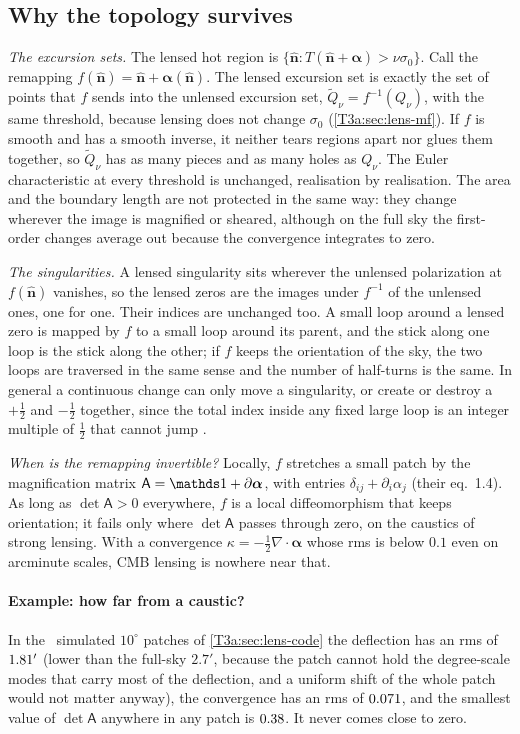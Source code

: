 \subsection{Why the topology survives}
\label{T3a:sec:protect}

\emph{The excursion sets.} The lensed hot region is $\{\hat{\bm n}:T(\hat{\bm n}+\bm\alpha)>\nu\sigma_0\}$. Call the remapping $f(\hat{\bm n})=\hat{\bm n}+\bm\alpha(\hat{\bm n})$. The lensed excursion set is exactly the set of points that $f$ sends into the unlensed excursion set, $\tilde Q_\nu=f^{-1}(Q_\nu)$, with the same threshold, because lensing does not change $\sigma_0$ (\cref{T3a:sec:lens-mf}). If $f$ is smooth and has a smooth inverse, it neither tears regions apart nor glues them together, so $\tilde Q_\nu$ has as many pieces and as many holes as $Q_\nu$. The Euler characteristic at every threshold is unchanged, realisation by realisation. The area and the boundary length are not protected in the same way: they change wherever the image is magnified or sheared, although on the full sky the first-order changes average out because the convergence integrates to zero.

\emph{The singularities.} A lensed singularity sits wherever the unlensed polarization at $f(\hat{\bm n})$ vanishes, so the lensed zeros are the images under $f^{-1}$ of the unlensed ones, one for one. Their indices are unchanged too. A small loop around a lensed zero is mapped by $f$ to a small loop around its parent, and the stick along one loop is the stick along the other; if $f$ keeps the orientation of the sky, the two loops are traversed in the same sense and the number of half-turns is the same. In general a continuous change can only move a singularity, or create or destroy a $+\frac12$ and $-\frac12$ together, since the total index inside any fixed large loop is an integer multiple of $\frac12$ that cannot jump \cite{VachaspatiLue2003}.

\emph{When is the remapping invertible?} Locally, $f$ stretches a small patch by the magnification matrix $\mathsf A=\Id+\partial\bm\alpha$, with entries $\delta_{ij}+\partial_i\alpha_j$ \cite{LewisChallinor2006} (their eq.~1.4). As long as $\det\mathsf A>0$ everywhere, $f$ is a local diffeomorphism that keeps orientation; it fails only where $\det\mathsf A$ passes through zero, on the caustics of strong lensing. With a convergence $\kappa=-\frac12\nabla\cdot\bm\alpha$ whose rms is below $0.1$ even on arcminute scales, CMB lensing is nowhere near that.

\paragraph{Example: how far from a caustic?} In the \TdNreal\ simulated $10^\circ$ patches of \cref{T3a:sec:lens-code} the deflection has an rms of $1.81'$ (lower than the full-sky $2.7'$, because the patch cannot hold the degree-scale modes that carry most of the deflection, and a uniform shift of the whole patch would not matter anyway), the convergence has an rms of $0.071$, and the smallest value of $\det\mathsf A$ anywhere in any patch is $0.38$. It never comes close to zero.

